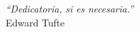 \newpage
\vspace{1cm}
\setlength{\baselineskip}{0.8cm}

\begin{flushright}
\textit{``Dedicatoria, si es necesaria.''
}\\
Edward Tufte
\end{flushright}